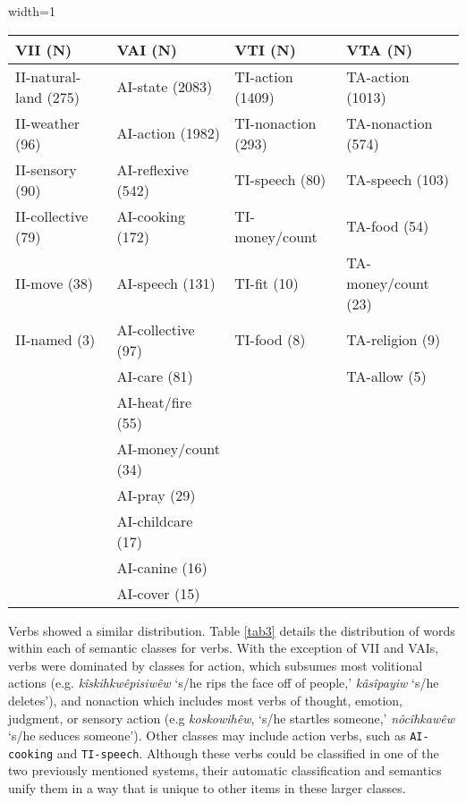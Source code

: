 \begin{table*}[]
\begin{adjustbox}{width=1\textwidth}
\begin{tabular}{llll}
\toprule
VII (N)                 & VAI (N)        & VTI (N)                   & VTA (N)             \\
\midrule
II-natural-land (275)        & AI-state (2083)     & TI-action (1409)   & TA-action (1013)    \\
II-weather (96)              & AI-action (1982)    & TI-nonaction (293) & TA-nonaction (574)  \\
II-sensory  (90)             & AI-reflexive (542)  & TI-speech (80)     & TA-speech (103)     \\
II-collective  (79)          & AI-cooking (172)    & TI-money/count     & TA-food (54)        \\
II-move (38)                 & AI-speech (131)     & TI-fit (10)        & TA-money/count (23) \\
II-named   (3)               & AI-collective (97)  & TI-food (8)        & TA-religion (9)     \\
                             & AI-care (81)        &                    & TA-allow (5)        \\
                             & AI-heat/fire (55)   &                    &                     \\
                             & AI-money/count (34) &                    &                     \\
                             & AI-pray (29)        &                    &                     \\
                             & AI-childcare (17)   &                    &                     \\
                             & AI-canine (16)      &                    &                     \\
                             & AI-cover (15)       &                    &                     \\
\bottomrule
\end{tabular}
\end{adjustbox}
\caption{Manually Adjusted Verb Classes}
\label{tab3}
\end{table*}



Verbs showed a similar distribution. Table \ref{tab3} details the distribution of words within each of semantic classes for verbs. With the exception of VII and VAIs, verbs were dominated by classes for action, which subsumes most volitional actions (e.g. \textit{kîskihkwêpisiwêw} ‘s/he rips the face off of people,’ \textit{kâsîpayiw} ‘s/he deletes’), and nonaction which includes most verbs of thought, emotion, judgment, or sensory action (e.g \textit{koskowihêw}, ‘s/he startles someone,’  \textit{nôcîhkawêw} ‘s/he seduces someone’). Other classes may include action verbs, such as \texttt{AI-cooking} and \texttt{TI-speech}. Although these verbs could be classified in one of the two previously mentioned systems, their automatic classification and semantics unify them in a way that is unique to other items in these larger classes. 

